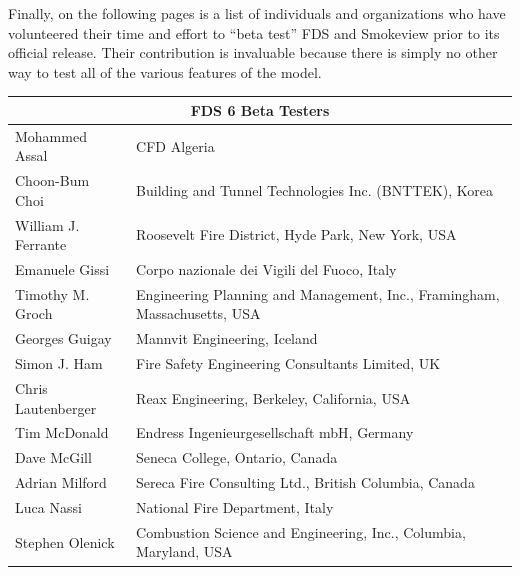 \documentclass[11pt]{book}
\begin{document}
Finally, on the following pages is a list of individuals and organizations who have volunteered their time and effort to
``beta test'' FDS and Smokeview prior to its official release. Their contribution is invaluable because there is simply no other way
to test all of the various features of the model.

\newpage

\begin{longtable}{|l|l|}
\hline
\multicolumn{2}{|c|}{\bf FDS 6 Beta Testers} \\ \hline \hline
Mohammed Assal                          & CFD Algeria                                                               \\ \hline
Choon-Bum Choi                          & Building and Tunnel Technologies Inc. (BNTTEK), Korea                     \\ \hline
William J. Ferrante                     & Roosevelt Fire District, Hyde Park, New York, USA                         \\ \hline
Emanuele Gissi                          & Corpo nazionale dei Vigili del Fuoco, Italy                               \\ \hline
Timothy M. Groch                        & Engineering Planning and Management, Inc., Framingham, Massachusetts, USA \\ \hline
Georges Guigay                          & Mannvit Engineering, Iceland                                              \\ \hline
Simon J. Ham                            & Fire Safety Engineering Consultants Limited, UK                           \\ \hline
Chris Lautenberger                      & Reax Engineering, Berkeley, California, USA                               \\ \hline
Tim McDonald                            & Endress Ingenieurgesellschaft mbH, Germany                                \\ \hline
Dave McGill                             & Seneca College, Ontario, Canada                                           \\ \hline
Adrian Milford                          & Sereca Fire Consulting Ltd., British Columbia, Canada                     \\ \hline
Luca Nassi                              & National Fire Department, Italy                                           \\ \hline
Stephen Olenick                         & Combustion Science and Engineering, Inc., Columbia, Maryland, USA         \\ \hline

\end{longtable}
\end{document}
